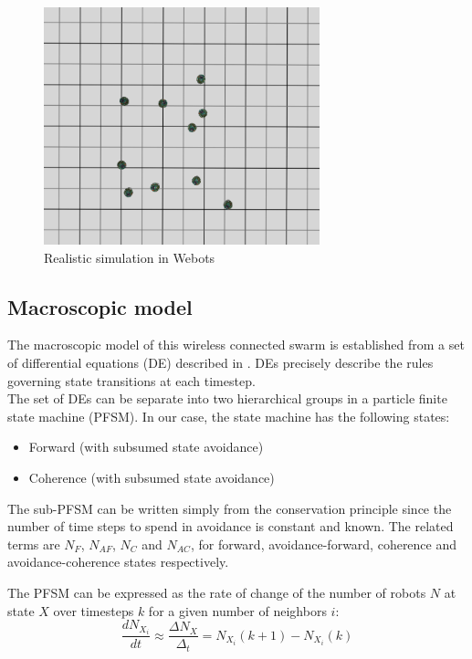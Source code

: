 \documentclass[a4paper, 10pt, conference]{ieeeconf}
\begin{document}
  \begin{figure}[h]
    \begin{center}
      \includegraphics[width=8cm]{figures/swarm-10-screenshot.png}
      \caption{Realistic simulation in Webots}
    \end{center}
  \end{figure}

  \subsection{Macroscopic model}
  The macroscopic model of this wireless connected swarm is established from a set of differential equations (DE) described in \cite{Winfield08}. DEs precisely describe the rules governing state transitions at each timestep.\\

  The set of DEs can be separate into two hierarchical groups in a particle finite state machine (PFSM). In our case, the state machine has the following states:\\
  \begin{itemize}
    \item Forward (with subsumed state avoidance)
    \item Coherence (with subsumed state avoidance)
  \end{itemize}

  The sub-PFSM can be written simply from the conservation principle since the number of time steps to spend in avoidance is constant and known. The related terms are $N_F$, $N_{AF}$, $N_C$ and $N_{AC}$, for forward, avoidance-forward, coherence and avoidance-coherence states respectively.

  The PFSM can be expressed as the rate of change of the number of robots $N$ at state $X$ over timesteps $k$ for a given number of neighbors $i$:
  \[
    \frac{dN_{X_i}}{dt} \approx \frac{\Delta N_X}{\Delta_t} = N_{X_i}(k+1) - N_{X_i}(k)
  \]
\end{document}
